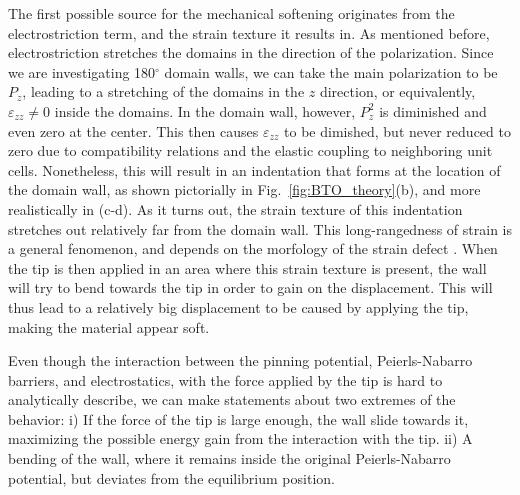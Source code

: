 {The first possible source for the mechanical softening originates from the electrostriction term, and the strain texture it results in. As mentioned before, electrostriction stretches the domains in the direction of the polarization. Since we are investigating 180$^\circ$ domain walls, we can take the main polarization to be $P_z$, leading to a stretching of the domains in the $z$ direction, or equivalently, $\varepsilon_{zz} \neq 0$ inside the domains. In the domain wall, however, $P_z^2$ is diminished and even zero at the center. This then causes $\varepsilon_{zz}$ to be dimished, but never reduced to zero due to compatibility relations and the elastic coupling to neighboring unit cells. Nonetheless, this will result in an indentation that forms at the location of the domain wall, as shown pictorially in Fig.~\ref{fig:BTO_theory}(b), and more realistically in (c-d). As it turns out, the strain texture of this indentation stretches out relatively far  from the domain wall. This long-rangedness of strain is a general fenomenon, and depends on the morfology of the strain defect . When the tip is then applied in an area where this strain texture is present, the wall will try to bend towards the tip in order to gain on the displacement. This will thus lead to a relatively big displacement to be caused by applying the tip, making the material appear soft.

Even though the interaction between the pinning potential, Peierls-Nabarro barriers, and electrostatics, with the force applied by the tip is hard to analytically describe, we can make statements about two extremes of the behavior: i) If the force of the tip is large enough, the wall slide towards it, maximizing the possible energy gain from the interaction with the tip.  ii) A bending of the wall, where it remains inside the original Peierls-Nabarro potential, but deviates from  the equilibrium position. 

}
